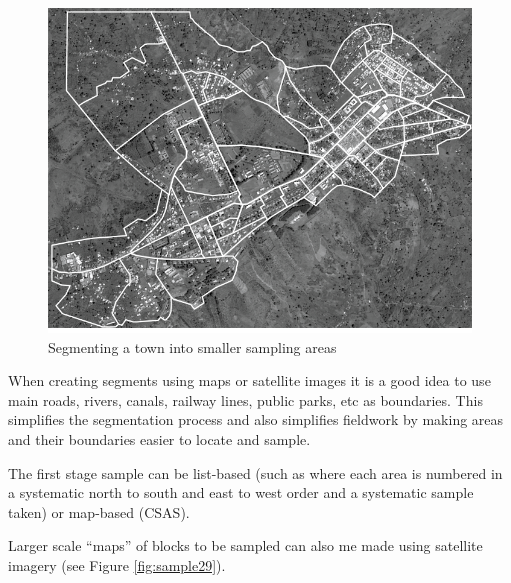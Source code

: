 \documentclass[12pt,a4paper]{book}
\theoremstyle{definition}
\theoremstyle{definition}
\theoremstyle{definition}
\theoremstyle{remark}
\begin{document}
\begin{figure}[H]

{\centering \includegraphics[width=9.76in]{figures/stage2sample14} 

}

\caption{Segmenting a town into smaller sampling areas}\label{fig:sample28}
\end{figure}

When creating segments using maps or satellite images it is a good idea
to use main roads, rivers, canals, railway lines, public parks, etc as
boundaries. This simplifies the segmentation process and also simplifies
fieldwork by making areas and their boundaries easier to locate and
sample.

The first stage sample can be list-based (such as where each area is
numbered in a systematic north to south and east to west order and a
systematic sample taken) or map-based (CSAS).

Larger scale ``maps'' of blocks to be sampled can also me made using
satellite imagery (see Figure \ref{fig:sample29}).

\newpage
\end{document}

